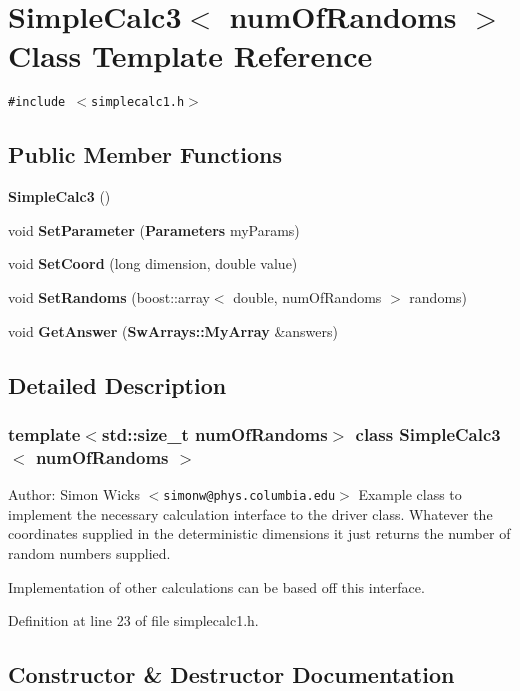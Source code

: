 \section{SimpleCalc3$<$ numOfRandoms $>$ Class Template Reference}
\label{classSimpleCalc3}
{\tt \#include $<$simplecalc1.h$>$}

\subsection*{Public Member Functions}
\begin{CompactItemize}
\item 
{\bf SimpleCalc3} ()
\item 
void {\bf SetParameter} ({\bf Parameters} myParams)
\item 
void {\bf SetCoord} (long dimension, double value)
\item 
void {\bf SetRandoms} (boost::array$<$ double, numOfRandoms $>$ randoms)
\item 
void {\bf GetAnswer} ({\bf SwArrays::MyArray} \&answers)
\end{CompactItemize}


\subsection{Detailed Description}
\subsubsection*{template$<$std::size\_\-t numOfRandoms$>$ class SimpleCalc3$<$ numOfRandoms $>$}

\begin{Desc}
\item[Author:]Simon Wicks $<${\tt simonw@phys.columbia.edu}$>$ Example class to implement the necessary calculation interface to the driver class. Whatever the coordinates supplied in the deterministic dimensions it just returns the number of random numbers supplied.\end{Desc}
Implementation of other calculations can be based off this interface. 

Definition at line 23 of file simplecalc1.h.

\subsection{Constructor \& Destructor Documentation}
